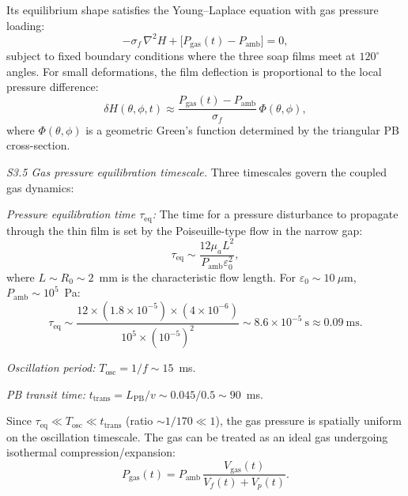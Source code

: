 \documentclass[%
 preprint,
 superscriptaddress,
 amsmath,amssymb,
 aps, prl,
]{revtex4-2}
\begin{document}
Its equilibrium shape satisfies the Young--Laplace equation with gas pressure loading:
\begin{equation}
-\sigma_f\,\nabla^2 H + \bigl[P_{\text{gas}}(t) - P_{\text{amb}}\bigr] = 0,
\label{eq:s3_young_laplace}
\end{equation}
subject to fixed boundary conditions where the three soap films meet at $120^\circ$ angles. For small deformations, the film deflection is proportional to the local pressure difference:
\begin{equation}
\delta H(\theta,\phi,t) \approx
\frac{P_{\text{gas}}(t) - P_{\text{amb}}}{\sigma_f}\,
\Phi(\theta,\phi),
\label{eq:s3_deflection}
\end{equation}
where $\Phi(\theta,\phi)$ is a geometric Green's function determined by the triangular PB cross-section.\par

{\noindent\textit{S3.5 Gas pressure equilibration timescale.}}
Three timescales govern the coupled gas dynamics:\par

\textit{Pressure equilibration time $\tau_{\text{eq}}$:} The time for a pressure disturbance to propagate through the thin film is set by the Poiseuille-type flow in the narrow gap:
\begin{equation}
\tau_{\text{eq}} \sim \frac{12\mu_a L^2}{P_{\text{amb}}\varepsilon_0^2},
\label{eq:s3_taueq}
\end{equation}
where $L \sim R_0 \sim 2$~mm is the characteristic flow length. For $\varepsilon_0 \sim 10~\mu\text{m}$, $P_{\text{amb}} \sim 10^5$~Pa:
\begin{equation}
\tau_{\text{eq}} \sim \frac{12\times(1.8\times10^{-5})\times(4\times10^{-6})}
{10^5\times(10^{-5})^2}
\sim 8.6\times10^{-5}~\text{s} \approx 0.09~\text{ms}.
\end{equation}

\textit{Oscillation period:} $T_{\text{osc}} = 1/f \sim 15$~ms.

\textit{PB transit time:} $t_{\text{trans}} = L_{\text{PB}}/v \sim 0.045/0.5 \sim 90$~ms.\par

Since $\tau_{\text{eq}} \ll T_{\text{osc}} \ll t_{\text{trans}}$ (ratio $\sim 1/170 \ll 1$), the gas pressure is spatially uniform on the oscillation timescale. The gas can be treated as an ideal gas undergoing isothermal compression/expansion:
\begin{equation}
P_{\text{gas}}(t) = P_{\text{amb}}\,
\frac{V_{\text{gas}}(t)}{V_f(t) + V_p(t)}.
\label{eq:s3_ideal_gas}
\end{equation}
\end{document}
